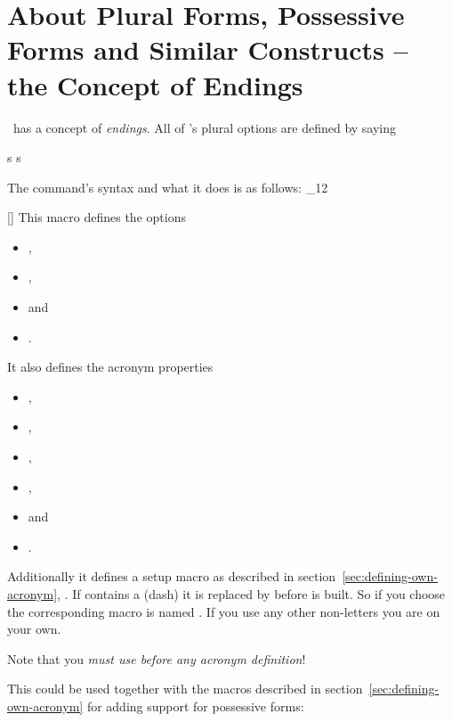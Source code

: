 \documentclass[load-preamble+,scrartcl={DIV10}]{cnltx-doc}
\makeatletter
\renewenvironment{commands}
  {%
    \cnltx@set@catcode_{12}%
    \let\command\cnltx@command
    \cnltxlist
  }
  {\endcnltxlist}
\makeatother
\begin{document}
\section{About Plural Forms, Possessive Forms and Similar Constructs -- the
  Concept of Endings}

\acro\ has a concept of \emph{endings}.  All of \acro's plural options are
defined by saying
\begin{sourcecode}
   {s} {s}
\end{sourcecode}
The command's syntax and what it does is as follows:
\begin{commands}
  \command{ProvideAcroEnding}[]
    This macro defines the options
    \begin{itemize}
      \item {},
      \item {},
      \item {} and
      \item {}.
    \end{itemize}
    It also defines the acronym properties
    \begin{itemize}
      \item {},
      \item {},
      \item {},
      \item {},
      \item {} and
      \item {}.
    \end{itemize}
    Additionally it defines a setup macro as
    described in section~\ref{sec:defining-own-acronym},
    .  If  contains a \code{-} (dash) it is
    replaced by \code{\_} before  is built.  So if you
    choose  the corresponding macro is named
    .  If you use any other non-letters you are on your
    own.

    Note that you \emph{must use  before any acronym
      definition}!
\end{commands}

This could be used together with the macros described in
section~\ref{sec:defining-own-acronym} for adding support for possessive
forms:
\end{document}
